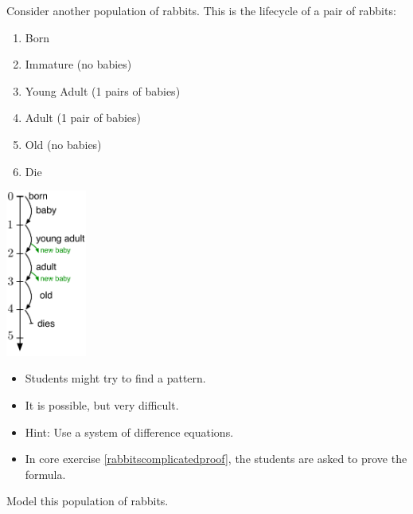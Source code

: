 \bookonlynewpage


\question
	Consider another population of rabbits. This is the lifecycle of a pair of rabbits:

\begin{minipage}{.6\textwidth}
\begin{enumerate}[start=0,label=(year \arabic*)]
		\item Born
		\item Immature (no babies)
		\item Young Adult (1 pairs of babies)
		\item Adult (1 pair of babies)
		\item Old (no babies)
		\item Die
	\end{enumerate}	
\end{minipage}
\hfil
\begin{minipage}{75pt}
	\includegraphics*[width=75pt]{images/module24-complicated-life.pdf}
\end{minipage}
\begin{annotation}
	\begin{goals}
		\begin{itemize}
			\item Students might try to find a pattern. 
			\item It is possible, but very difficult.
			\item Hint: Use a system of difference equations. 
			\item In core exercise \ref{rabbitscomplicatedproof}, the students are asked to prove the formula.
		\end{itemize}
	\end{goals}
\end{annotation}
	
	Model this population of rabbits.
	
	




\standardonlynewpage




